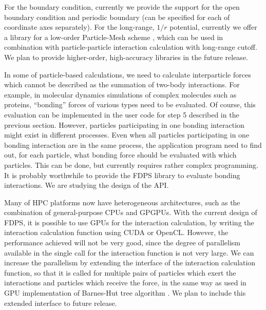 \documentclass[dvipdfmx]{acm_proc_article-sp}
\begin{document}
For the boundary condition, currently we provide the support for the
open boundary condition and periodic boundary (can be specified for
each of coordinate axes separately). For the long-range, $1/r$
potential, currently we offer a library for a low-order Particle-Mesh
scheme \cite{hockney1988computer, 1995ApJS...98..355X,
    2000ApJS..128..561B, 2002JApA...23..185B, 2004NewA....9..111D,
    springel:gadget2, 2005PASJ...57..849Y, ishiyama:greem,
    ishiyama:gordonbell}, which can be used in combination with
particle-particle interaction calculation with long-range cutoff. We
plan to provide higher-order, high-accuracy libraries in the future
release.

In some of particle-based calculations, we need to calculate
interparticle forces which cannot be described as the summation of
two-body interactions. For example, in molecular dynamics simulations
of complex molecules such as proteins, ``bonding'' forces of various
types need to be evaluated. Of course, this evaluation can be
implemented in the user code for step 5 described in the previous
section. However, particles participating in one bonding interaction
might exist in different processes. Even when all particles
participating in one bonding interaction are in the same process, the
application program need to find out, for each particle, what bonding
force should be evaluated with which particles. This can be done, but
currently requires rather complex programming.  It is probably
worthwhile to provide the FDPS library to evaluate bonding
interactions. We are studying the design of the API.

Many of HPC platforms now have heterogeneous architectures, such as
the combination of general-purpose CPUs and GPGPUs. With the current
design of FDPS, it is possible to use GPUs for the interaction
calculation, by writing the interaction calculation function using
CUDA or OpenCL. However, the performance achieved
will not be very good, since the degree of parallelism available in
the single call for the interaction function is not very large. We can
increase the parallelism by extending the interface of the interaction
calculation function, so that it is called for multiple pairs of
particles which exert the interactions and particles which receive the
force, in the same way as used in GPU implementation of Barnes-Hut
tree algorithm {\cite{hamada2009novel,
    Hamada:2009:THN:1654059.1654123, Hamada:2010:TAN:1884643.1884644,
    Bedorf:2014:PGT:2683593.2683600}}. We plan to include this
extended interface to future release.
\end{document}

